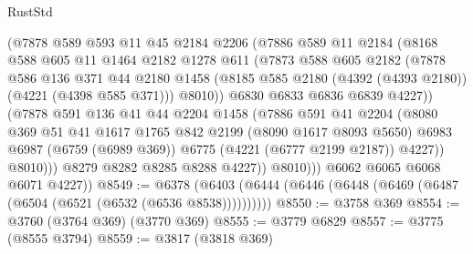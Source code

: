 \begin{lexlean}{RustStd}
\begin{coremodule}
                    (@7878
                      @589
                      @593
                      @11
                      @45
                      @2184
                      @2206
                      (@7886
                        @589
                        @11
                        @2184
                        (@8168
                          @588
                          @605
                          @11
                          @1464
                          @2182
                          @1278
                          @611
                          (@7873
                            @588
                            @605
                            @2182
                            (@7878
                              @586
                              @136
                              @371
                              @44
                              @2180
                              @1458
                              (@8185 @585 @2180 (@4392 (@4393 @2180)) (@4221 (@4398 @585 @371)))
                              @8010))
                          @6830
                          @6833
                          @6836
                          @6839
                          @4227))
                      (@7878
                        @591
                        @136
                        @41
                        @44
                        @2204
                        @1458
                        (@7886
                          @591
                          @41
                          @2204
                          (@8080
                            @369
                            @51
                            @41
                            @1617
                            @1765
                            @842
                            @2199
                            (@8090 @1617 @8093 @5650)
                            @6983
                            @6987
                            (@6759 (@6989 @369))
                            @6775
                            (@4221 (@6777 @2199 @2187))
                            @4227))
                        @8010)))
                  @8279
                  @8282
                  @8285
                  @8288
                  @4227))
              @8010)))
        @6062
        @6065
        @6068
        @6071
        @4227))
@8549 := @6378 (@6403 (@6444 (@6446 (@6448 (@6469 (@6487 (@6504 (@6521 (@6532 (@6536 @8538))))))))))
@8550 := @3758 @369
@8554 := @3760 (@3764 @369) (@3770 @369)
@8555 := @3779 @6829
@8557 := @3775 (@8555 @3794)
@8559 := @3817 (@3818 @369)

\end{coremodule}
\end{lexlean}
